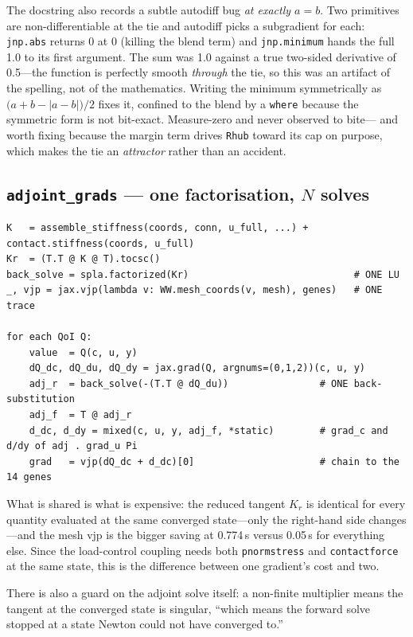 \documentclass[11pt,a4paper]{article}
\DeclareRobustCommand{\code}[1]{%
  \texttt{\small\def\_{\textunderscore\discretionary{}{}{}}#1}}
\begin{document}
The docstring also records a subtle autodiff bug \emph{at exactly $a = b$}. Two
primitives are non-differentiable at the tie and autodiff picks a subgradient for each:
\code{jnp.abs} returns 0 at 0 (killing the blend term) and \code{jnp.minimum} hands the
full 1.0 to its first argument. The sum was 1.0 against a true two-sided derivative of
0.5---the function is perfectly smooth \emph{through} the tie, so this was an artifact
of the spelling, not of the mathematics. Writing the minimum symmetrically as
$\bigl(a + b - |a - b|\bigr)/2$ fixes it, confined to the blend by a \code{where}
because the symmetric form is not bit-exact. Measure-zero and never observed to bite---%
and worth fixing because the margin term drives \code{R\_hub} toward its cap on purpose,
which makes the tie an \emph{attractor} rather than an accident.

\subsection{\texttt{adjoint\_grads} --- one factorisation, \texorpdfstring{$N$}{N} solves}
\label{sec:adjointgrads}

\begin{lstlisting}[style=py]
K   = assemble_stiffness(coords, conn, u_full, ...) + contact.stiffness(coords, u_full)
Kr  = (T.T @ K @ T).tocsc()
back_solve = spla.factorized(Kr)                             # ONE LU
_, vjp = jax.vjp(lambda v: WW.mesh_coords(v, mesh), genes)   # ONE trace

for each QoI Q:
    value  = Q(c, u, y)
    dQ_dc, dQ_du, dQ_dy = jax.grad(Q, argnums=(0,1,2))(c, u, y)
    adj_r  = back_solve(-(T.T @ dQ_du))                # ONE back-substitution
    adj_f  = T @ adj_r
    d_dc, d_dy = mixed(c, u, y, adj_f, *static)        # grad_c and d/dy of adj . grad_u Pi
    grad   = vjp(dQ_dc + d_dc)[0]                      # chain to the 14 genes
\end{lstlisting}

What is shared is what is expensive: the reduced tangent $K_r$ is identical for every
quantity evaluated at the same converged state---only the right-hand side changes---and
the mesh vjp is the bigger saving at 0.774\,s versus 0.05\,s for everything else. Since
the load-control coupling needs both \code{pnorm\_stress} and \code{contact\_force} at
the same state, this is the difference between one gradient's cost and two.

There is also a guard on the adjoint solve itself: a non-finite multiplier means the
tangent at the converged state is singular, ``which means the forward solve stopped at a
state Newton could not have converged to.''
\end{document}

